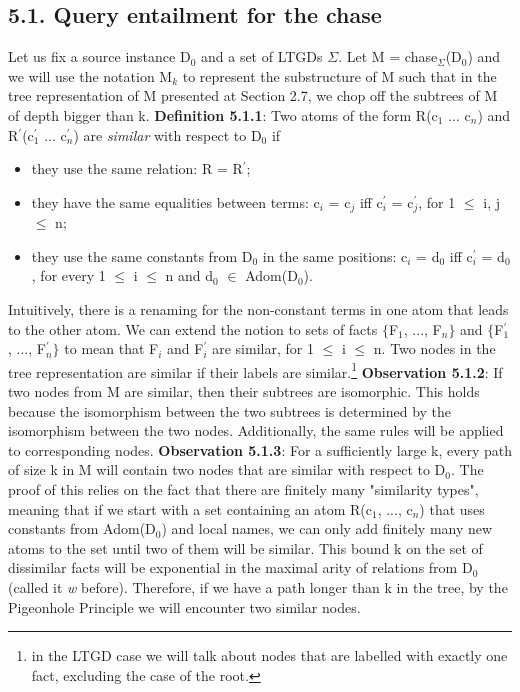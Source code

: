 \documentclass[11pt, a4paper, dvipsnames]{article}
\begin{document}
\subsection{5.1. Query entailment for the chase}
Let us fix a source instance D$_{0}$ and a set of LTGDs $\Sigma$. Let M = chase$_{\Sigma}$(D$_{0}$) and we will use the notation M$_{k}$ to represent the substructure of M such that in the tree representation of M presented at Section 2.7, we chop off the subtrees of M of depth bigger than k.\newline
\textbf{Definition 5.1.1}: Two atoms of the form R(c$_{1}$ ... c$_{n}$) and R$^{'}$(c$^{'}_{1}$ ... c$^{'}_{n}$) are \textit{similar} with respect to D$_{0}$ if
\begin{itemize}
	\item they use the same relation: R = R$^{'}$;
	\item they have the same equalities between terms: c$_{i}$ = c$_{j}$ iff c$^{'}_{i}$ = c$^{'}_{j}$, for 1 $\leq$ i, j $\leq$ n;
	\item they use the same constants from D$_{0}$ in the same positions: c$_{i}$ = d$_{0}$ iff c$^{'}_{i}$ = d$_{0}$, for every 1 $\leq$ i $\leq$ n and d$_{0}$ $\in$ Adom(D$_{0}$).
\end{itemize} 
Intuitively, there is a renaming for the non-constant terms in one atom that leads to the other atom. We can extend the notion to sets of facts $\{$F$_{1}$, ..., F$_{n}\}$ and $\{$F$^{'}_{1}$, ..., F$^{'}_{n}\}$ to mean that F$_{i}$ and F$^{'}_{i}$ are similar, for 1 $\leq$ i $\leq$ n. Two nodes in the tree representation are similar if their labels are similar.\footnote{in the LTGD case we will talk about nodes that are labelled with exactly one fact, excluding the case of the root.}\newline
\textbf{Observation 5.1.2}: If two nodes from M are similar, then their subtrees are isomorphic.\newline
This holds because the isomorphism between the two subtrees is determined by the isomorphism between the two nodes. Additionally, the same rules will be applied to corresponding nodes.\newline
\textbf{Observation 5.1.3}: For a sufficiently large k, every path of size k in M will contain two nodes that are similar with respect to D$_{0}$.\newline
The proof of this relies on the fact that there are finitely many "similarity types", meaning that if we start with a set containing an atom R(c$_{1}$, ..., c$_{n}$) that uses constants from Adom(D$_{0}$) and local names, we can only add finitely many new atoms to the set until two of them will be similar. This bound k on the set of dissimilar facts will be exponential in the maximal arity of relations from D$_{0}$ (called it \textit{w} before). Therefore, if we have a path longer than k in the tree, by the Pigeonhole Principle we will encounter two similar nodes.\newline
\end{document}
